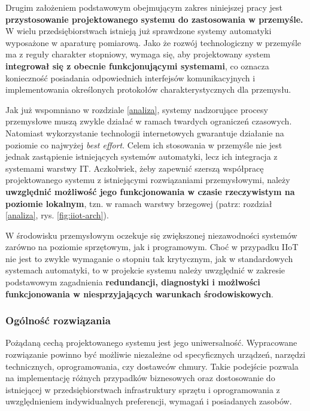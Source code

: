 \documentclass[a4paper, 12pt, twoside]{article}
\begin{document}
Drugim założeniem podstawowym obejmującym zakres niniejszej pracy
jest \textbf{przystosowanie projektowanego systemu do zastosowania w przemyśle.} 
W wielu przedsiębiorstwach istnieją już sprawdzone systemy automatyki wyposażone
w aparaturę pomiarową. Jako że rozwój technologiczny w przemyśle ma z reguły
charakter stopniowy, wymaga się, aby projektowany system \textbf{integrował się 
z obecnie funkcjonującymi systemami}, co oznacza konieczność posiadania
odpowiednich interfejsów komunikacyjnych i implementowania określonych protokołów
charakterystycznych dla przemysłu. 

Jak już wspomniano w rozdziale \ref{analiza}, systemy nadzorujące
procesy przemysłowe muszą zwykle działać w ramach twardych ograniczeń czasowych.
Natomiast wykorzystanie technologii internetowych gwarantuje działanie na poziomie 
co najwyżej \emph{best effort}. Celem ich stosowania w przemyśle nie jest jednak zastąpienie
istniejących systemów automatyki, lecz ich integracja z systemami warstwy IT.
Aczkolwiek, żeby zapewnić szerszą współpracę projektowanego systemu 
z istniejącymi rozwiązaniami przemysłowymi, należy \textbf{uwzględnić możliwość jego funkcjonowania
w czasie rzeczywistym na poziomie lokalnym}, tzn. w ramach warstwy brzegowej 
(patrz: rozdział \ref{analiza}, rys. \ref{fig:iiot-arch}).

W środowisku przemysłowym oczekuje się zwiększonej niezawodności systemów
zarówno na poziomie sprzętowym, jak i programowym. Choć w przypadku IIoT nie jest
to zwykle wymaganie o stopniu tak krytycznym, jak w standardowych systemach automatyki,
to w projekcie systemu należy uwzględnić w zakresie podstawowym 
zagadnienia \textbf{redundancji, diagnostyki i możlwości funkcjonowania w niesprzyjających
warunkach środowiskowych}.

\subsubsection{Ogólność rozwiązania}

Pożądaną cechą projektowanego systemu jest jego uniwersalność. Wypracowane rozwiązanie
powinno być możliwie niezależne od specyficznych urządzeń, narzędzi technicznych,
oprogramowania, czy dostawców chmury. Takie podejście pozwala na implementację różnych przypadków biznesowych
oraz dostosowanie do istniejącej w przedsiębiorstwach infrastruktury sprzętu i oprogramowania
z uwzględnieniem indywidualnych preferencji, wymagań i posiadanych zasobów. 
\end{document}

